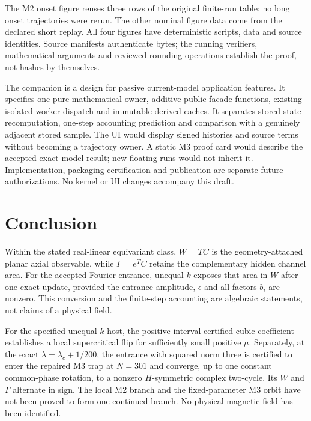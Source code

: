 \documentclass[11pt,a4paper]{article}
\begin{document}
The M2 onset figure reuses three rows of the original finite-run table; no long onset trajectories were rerun. The other nominal figure data come from the declared short replay. All four figures have deterministic scripts, data and source identities. Source manifests authenticate bytes; the running verifiers, mathematical arguments and reviewed rounding operations establish the proof, not hashes by themselves.

The companion  is a design for passive current-model application features. It specifies one pure mathematical owner, additive public facade functions, existing isolated-worker dispatch and immutable derived caches. It separates stored-state recomputation, one-step accounting prediction and comparison with a genuinely adjacent stored sample. The UI would display signed histories and source terms without becoming a trajectory owner. A static M3 proof card would describe the accepted exact-model result; new floating runs would not inherit it. Implementation, packaging certification and publication are separate future authorizations. No kernel or UI changes accompany this draft.

\section{Conclusion}
Within the stated real-linear equivariant class, $W=TC$ is the geometry-attached planar axial observable, while $\Gamma=e^TC$ retains the complementary hidden channel area. For the accepted Fourier entrance, unequal $k$ exposes that area in $W$ after one exact update, provided the entrance amplitude, $\epsilon$ and all factors $b_i$ are nonzero. This conversion and the finite-step accounting are algebraic statements, not claims of a physical field.

For the specified unequal-$k$ host, the positive interval-certified cubic coefficient establishes a local supercritical flip for sufficiently small positive $\mu$. Separately, at the exact $\lambda=\lambda_c+1/200$, the entrance with squared norm three is certified to enter the repaired M3 trap at $N=301$ and converge, up to one constant common-phase rotation, to a nonzero $H$-symmetric complex two-cycle. Its $W$ and $\Gamma$ alternate in sign. The local M2 branch and the fixed-parameter M3 orbit have not been proved to form one continued branch. No physical magnetic field has been identified.

\appendix
\end{document}
